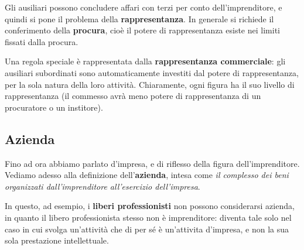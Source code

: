 \documentclass[a4paper,11pt]{article}
\begin{document}
Gli ausiliari possono concludere affari con terzi per conto dell'imprenditore, e quindi si pone il problema della \textbf{rappresentanza}.
In generale si richiede il conferimento della \textbf{procura}, cioè il potere di rappresentanza esiste nei limiti fissati dalla procura.

Una regola speciale è rappresentata dalla \textbf{rappresentanza commerciale}: gli ausiliari subordinati sono automaticamente investiti dal potere di rappresentanza, per la sola natura della loro attività. Chiaramente, ogni figura ha il suo livello di rappresentanza (il commesso avrà meno potere di rappresentanza di un procuratore o un institore).

\subsection{Azienda}
Fino ad ora abbiamo parlato d'impresa, e di riflesso della figura dell'imprenditore.
Vediamo adesso alla definizione dell'\textbf{azienda}, intesa come \textit{il complesso dei beni organizzati dall'imprenditore all'esercizio dell'impresa}.

In questo, ad esempio, i \textbf{liberi professionisti} non possono considerarsi azienda, in quanto il libero professionista stesso non è imprenditore: diventa tale solo nel caso in cui svolga un'attività che di per sé è un'attivita d'impresa, e non la sua sola prestazione intellettuale.
\end{document}
